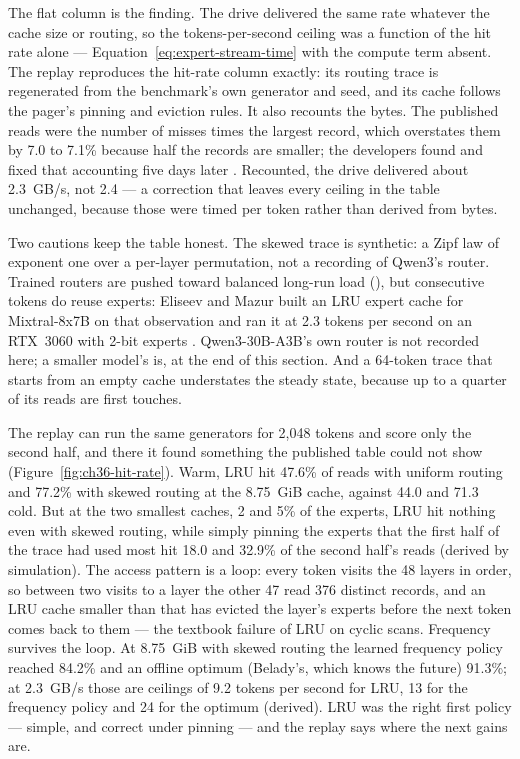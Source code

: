 The flat column is the finding. The drive delivered the same rate whatever the
cache size or routing, so the tokens-per-second ceiling was a function of the
hit rate alone --- Equation~\ref{eq:expert-stream-time} with the compute term
absent. The replay reproduces the hit-rate column exactly: its routing trace
is regenerated from the benchmark's own generator and seed, and its cache
follows the pager's pinning and eviction rules. It also recounts the bytes. The
published reads were the number of misses times the largest record, which
overstates them by 7.0 to 7.1\% because half the records are smaller; the
developers found and fixed that accounting five days later
\cite{hermon2026batchio}. Recounted, the drive delivered about 2.3~GB/s, not
2.4 --- a correction that leaves every ceiling in the table unchanged, because
those were timed per token rather than derived from bytes.

Two cautions keep the table honest. The skewed trace is synthetic: a Zipf law
of exponent one over a per-layer permutation, not a recording of Qwen3's
router. Trained routers are pushed toward balanced long-run load
(), but consecutive tokens do reuse experts:
Eliseev and Mazur built an LRU expert cache for Mixtral-8x7B on that
observation and ran it at 2.3 tokens per second on an RTX~3060 with 2-bit
experts \cite{eliseev2023moeoffload}. Qwen3-30B-A3B's own router is not
recorded here; a smaller model's is, at the end of this section. And a 64-token
trace that starts from an empty cache understates the steady state, because up
to a quarter of its reads are first touches.

The replay can run the same generators for 2,048 tokens and score only the
second half, and there it found something the published table could not show
(Figure~\ref{fig:ch36-hit-rate}). Warm, LRU hit 47.6\% of reads with uniform
routing and 77.2\% with skewed routing at the 8.75~GiB cache, against 44.0 and
71.3 cold. But at the two smallest caches, 2 and 5\% of the experts, LRU hit
nothing even with skewed routing, while simply pinning the experts that the
first half of the trace had used most hit 18.0 and 32.9\% of the second half's
reads (derived by simulation). The access pattern is a loop: every token visits
the 48 layers in order, so between two visits to a layer the other 47 read 376
distinct records, and an LRU cache smaller than that has evicted the layer's
experts before the next token comes back to them --- the textbook failure of LRU
on cyclic scans. Frequency survives the loop. At
8.75~GiB with skewed routing the learned frequency policy reached 84.2\% and an
offline optimum (Belady's, which knows the future) 91.3\%; at 2.3~GB/s those
are ceilings of 9.2 tokens per second for LRU, 13 for the frequency policy and
24 for the optimum (derived). LRU was the right first policy --- simple, and
correct under pinning --- and the replay says where the next gains are.


